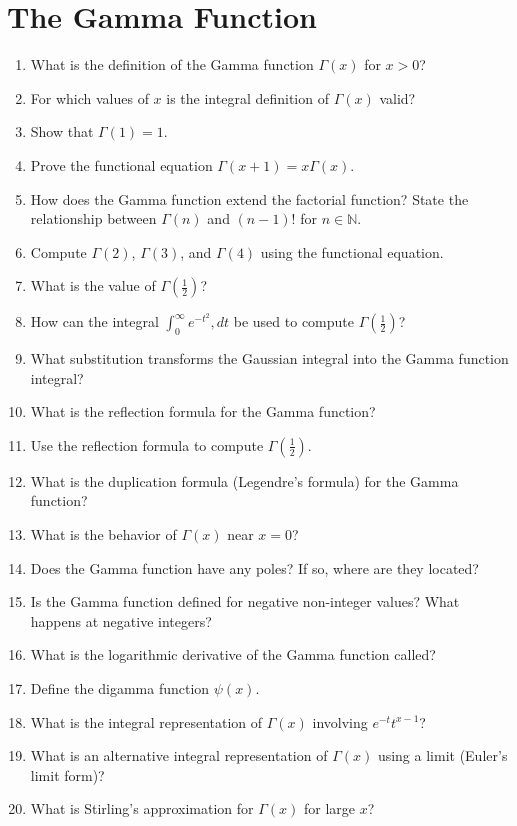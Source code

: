 \section{The Gamma Function}

\begin{enumerate}
  \item What is the definition of the Gamma function $\Gamma(x)$ for $x > 0$?
  \item For which values of $x$ is the integral definition of $\Gamma(x)$ valid?
  \item Show that $\Gamma(1) = 1$.
  \item Prove the functional equation $\Gamma(x+1) = x\Gamma(x)$.
  \item How does the Gamma function extend the factorial function? State the relationship between $\Gamma(n)$ and $(n-1)!$ for $n \in \mathbb{N}$.
  \item Compute $\Gamma(2)$, $\Gamma(3)$, and $\Gamma(4)$ using the functional equation.
  \item What is the value of $\Gamma\left(\tfrac{1}{2}\right)$?
  \item How can the integral $\int_0^\infty e^{-t^2},dt$ be used to compute $\Gamma\left(\tfrac{1}{2}\right)$?
  \item What substitution transforms the Gaussian integral into the Gamma function integral?
  \item What is the reflection formula for the Gamma function?
  \item Use the reflection formula to compute $\Gamma\left(\tfrac{1}{2}\right)$.
  \item What is the duplication formula (Legendre's formula) for the Gamma function?
  \item What is the behavior of $\Gamma(x)$ near $x = 0$?
  \item Does the Gamma function have any poles? If so, where are they located?
  \item Is the Gamma function defined for negative non-integer values? What happens at negative integers?
  \item What is the logarithmic derivative of the Gamma function called?
  \item Define the digamma function $\psi(x)$.
  \item What is the integral representation of $\Gamma(x)$ involving $e^{-t} t^{x-1}$?
  \item What is an alternative integral representation of $\Gamma(x)$ using a limit (Euler's limit form)?
  \item What is Stirling's approximation for $\Gamma(x)$ for large $x$?

\end{enumerate}
